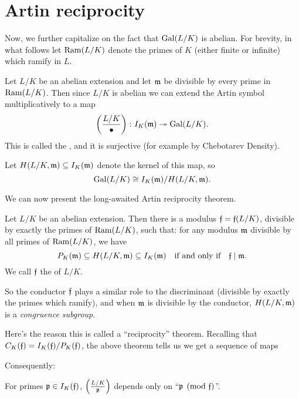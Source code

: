 \section{Artin reciprocity}
Now, we further capitalize on the fact that $\operatorname{Gal}(L/K)$ is abelian.
For brevity, in what follows let $\operatorname{Ram}(L/K)$ denote the primes of $K$
(either finite or infinite) which ramify in $L$.

\begin{definition}
	Let $L/K$ be an abelian extension and let $\mathfrak m$ be
	divisible by every prime in $\operatorname{Ram}(L/K)$.
	Then since $L/K$ is abelian we can extend the Artin symbol
	multiplicatively to a map
	\[ \left( \frac{L/K}{\bullet} \right) \colon I_K(\mathfrak m) \twoheadrightarrow \operatorname{Gal}(L/K). \]
	This is called the ,
	and it is surjective (for example by Chebotarev Density).

	Let $H(L/K, \mathfrak m) \subseteq I_K(\mathfrak m)$ denote the kernel of this map, so
	\[ \operatorname{Gal}(L/K) \cong I_K(\mathfrak m) / H(L/K, \mathfrak m). \]
\end{definition}

We can now present the long-awaited Artin reciprocity theorem.
\begin{theorem}
	Let $L/K$ be an abelian extension.
	Then there is a modulus $\mathfrak f = \mathfrak f(L/K)$,
	divisible by exactly the primes of $\operatorname{Ram}(L/K)$, such that:
	for any modulus $\mathfrak m$ divisible by all primes of $\operatorname{Ram}(L/K)$, we have
	\[
		P_K(\mathfrak m) \subseteq H(L/K, \mathfrak m) \subseteq I_K(\mathfrak m)
		\quad\text{if and only if}\quad
		\mathfrak f \mid \mathfrak m.
	\]
	We call $\mathfrak f$ the  of $L/K$.
\end{theorem}
So the conductor $\mathfrak f$ plays a similar role to the discriminant
(divisible by exactly the primes which ramify),
and when $\mathfrak m$ is divisible by the conductor,
$H(L/K, \mathfrak m)$ is a \emph{congruence subgroup}.

Here's the reason this is called a ``reciprocity'' theorem.
Recalling that $C_K(\mathfrak f) = I_K(\mathfrak f) / P_K(\mathfrak f)$,
the above theorem tells us we get a sequence of maps
\begin{center}
\end{center}
Consequently:
\begin{moral}
	For primes $\mathfrak p \in I_K(\mathfrak f)$,
	$\left( \frac{L/K}{\mathfrak p} \right)$ depends
	only on ``$\mathfrak p \pmod {\mathfrak f}$''.
\end{moral}

